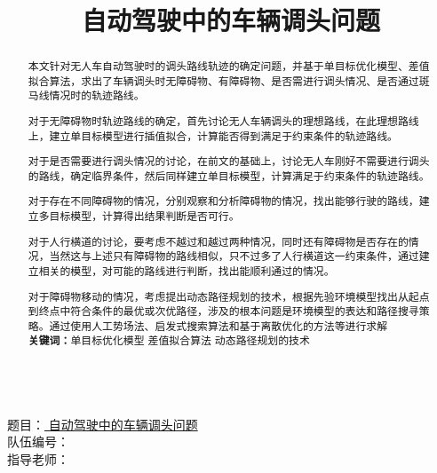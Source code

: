 \documentclass{article}
\title{\zihao{-2}自动驾驶中的车辆调头问题\vspace{-2em}}
\date{}     %
\author{}   %
\begin{document}
\setlength{\parindent}{2em}

\newpage
{                                                  %
    \qquad
    \\[10ex]
    题目：\underline{\hspace{0.6em} 自动驾驶中的车辆调头问题 \hspace{0.6em}}
    \\[10ex]
    队伍编号：\underline{\qquad {} \quad \qquad}
    \\[10ex]
    指导老师：\underline{\qquad \qquad \qquad \qquad \qquad \qquad }
}
\thispagestyle{empty}                                       %

\maketitle                                                  %
\thispagestyle{empty}                                       %
\begin{abstract}                                            %
    {                                                 %
        \quad 本文针对无人车自动驾驶时的调头路线轨迹的确定问题，并基于单目标优化模型、差值拟合算法，求出了车辆调头时无障碍物、有障碍物、是否需进行调头情况、是否通过斑马线情况时的轨迹路线。

        对于无障碍物时轨迹路线的确定，首先讨论无人车辆调头的理想路线，在此理想路线上，建立单目标模型进行插值拟合，计算能否得到满足于约束条件的轨迹路线。

        对于是否需要进行调头情况的讨论，在前文的基础上，讨论无人车刚好不需要进行调头的路线，确定临界条件，然后同样建立单目标模型，计算满足于约束条件的轨迹路线。

        对于存在不同障碍物的情况，分别观察和分析障碍物的情况，找出能够行驶的路线，建立多目标模型，计算得出结果判断是否可行。

        对于人行横道的讨论，要考虑不越过和越过两种情况，同时还有障碍物是否存在的情况，当然这与上述只有障碍物的路线相似，只不过多了人行横道这一约束条件，通过建立相关的模型，对可能的路线进行判断，找出能顺利通过的情况。

        对于障碍物移动的情况，考虑提出动态路径规划的技术，根据先验环境模型找出从起点到终点中符合条件的最优或次优路径，涉及的根本问题是环境模型的表达和路径搜寻策略。通过使用人工势场法、启发式搜索算法和基于离散优化的方法等进行求解\\

        \noindent \textbf{关键词：}单目标优化模型 \quad 差值拟合算法 \quad 动态路径规划的技术
    }
    \thispagestyle{empty}
\end{abstract}                                              %
\newpage                                                    %
\setcounter{page}{1}                                        %
\end{document}
